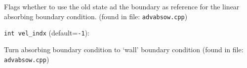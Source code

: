 Flags whether to use the old state ad the
boundary as reference for the linear absorbing
boundary condition.
 (found in file: \verb+advabsow.cpp+)
\item\verb+int vel_indx+ {\rm(default=\verb|-1|)}:

Turn absorbing boundary condition to `wall' boundary condition
 (found in file: \verb+advabsow.cpp+)
